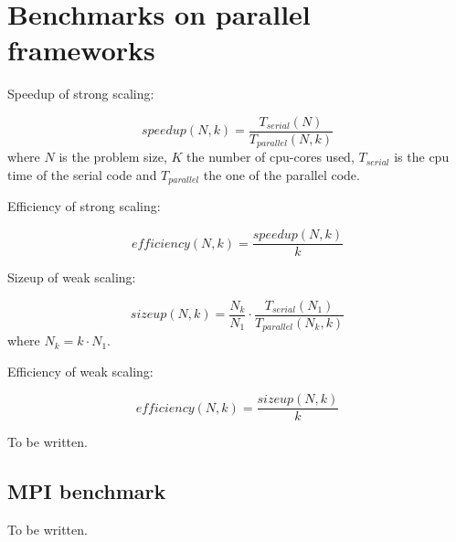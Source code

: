 \section{Benchmarks on parallel frameworks}\label{sec:parallel}

Speedup of strong scaling:

\begin{equation}
  speedup(N, k) = \frac{T_{serial}(N)}{T_{parallel}(N, k)}
  \label{eq:strong-scaling-speedup}
\end{equation}
where $N$ is the problem size, $K$ the number of cpu-cores used, $T_{serial}$ is the cpu time of the serial code and $T_{parallel}$ the one of the parallel code.

Efficiency of strong scaling:

\begin{equation}
  efficiency(N, k) = \frac{speedup(N, k)}{k}
  \label{eq:strong-scaling-efficiency}
\end{equation}

Sizeup of weak scaling:

\begin{equation}
  sizeup(N, k) = \frac{N_k}{N_1} \cdot \frac{T_{serial}(N_1)}{T_{parallel}(N_k, k)}
  \label{eq:weak-scaling-sizeup}
\end{equation}
where $N_k=k \cdot N_1$.

Efficiency of weak scaling:

\begin{equation}
  efficiency(N, k) = \frac{sizeup(N, k)}{k}
  \label{eq:weak-scaling-efficiency}
\end{equation}

{\color{red} To be written.}



\subsection{MPI benchmark}\label{subsec:mpi}

{\color{red} To be written.}

